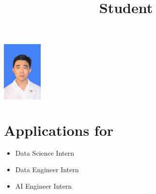 \documentclass[11pt,a4paper,sans]{moderncv}        %
\title{Student}
\begin{document}
\hypersetup{
    linkcolor=blue,
    filecolor=magenta,      
    urlcolor=cyan,
}

\noindent
\begin{minipage}{.78\textwidth}
 \makecvtitle
\end{minipage}%
\begin{minipage}{.30\textwidth}
  \centering
  \includegraphics[height=3cm]{avt.jpg}
\end{minipage}
\vspace{-1em}
\section{Applications for}
\begin{itemize}
\item Data Science Intern
\item Data Engineer Intern
\item AI Engineer Intern
\end{itemize}
\vspace{-1em}

\vspace{-1em}



\vspace{-1em}


\vspace{-1em}

%


\vspace{-1em}

\vspace{-1em}


\vspace{-1em}

 
\vspace{-1em}
\end{document}
